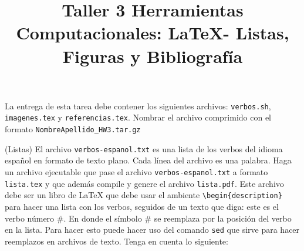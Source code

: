 \documentclass[12pt, letter]{exam}
\date{}
\title{\begin{LARGE}
{Taller 3 Herramientas Computacionales: \LaTeX \hspace{4pt}- Listas, Figuras y Bibliograf\'ia}
\end{LARGE}}
\begin{document}
\maketitle


La entrega de esta tarea debe contener los siguientes archivos: \verb'verbos.sh', \verb'imagenes.tex' y \verb'referencias.tex'. Nombrar el archivo comprimido con el formato \verb'NombreApellido_HW3.tar.gz'\\

\begin{questions}

\question {}(Listas) El archivo \verb|verbos-espanol.txt| es una lista de los verbos del idioma espa\~nol en formato de texto plano. Cada l\'inea del archivo es una palabra. Haga un archivo ejecutable que pase el archivo \verb|verbos-espanol.txt| a formato \verb|lista.tex| y que adem\'as compile y genere el archivo \verb|lista.pdf|. Este archivo debe ser un libro de \LaTeX \hspace{1pt} que debe usar el ambiente \verb|\begin{description}| para hacer una lista con los verbos, seguidos de un texto que diga: este es el verbo n\'umero \#. En donde el s\'imbolo \# se reemplaza por la posici\'on del verbo en la lista. Para hacer esto puede hacer uso del comando \verb|sed| que sirve para hacer reemplazos en archivos de texto. Tenga en cuenta lo siguiente:


\end{questions}
\end{document}

